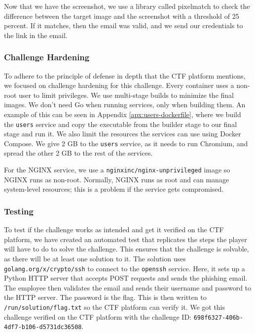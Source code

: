 Now that we have the screenshot, we use a library called pixelmatch\cite{github__pixelmatch} to check the difference between the target image and the screenshot with a threshold of 25 percent. If it matches, then the email was valid, and we send our credentials to the link in the email. 

\subsubsection{Challenge Hardening}

To adhere to the principle of defense in depth that the CTF platform mentions\cite{ctf_platform_documentation}, we focused on challenge hardening for this challenge. Every container uses a non-root user to limit privileges. We use multi-stage builds to minimize the final images. We don't need Go when running services, only when building them. An example of this can be seen in Appendix \ref{apx:users-dockerfile}, where we build the \texttt{users} service and copy the executable from the builder stage to our final stage and run it. We also limit the resources the services can use using Docker Compose. We give 2 GB to the \texttt{users} service, as it needs to run Chromium, and spread the other 2 GB to the rest of the services.

For the NGINX service, we use a \texttt{nginxinc/nginx-unprivileged} image so NGINX runs as non-root\cite{github__nginx_unprivileged}. Normally, NGINX runs as root and can manage system-level resources; this is a problem if the service gets compromised.

\subsubsection{Testing}

To test if the challenge works as intended and get it verified on the CTF platform, we have created an automated test that replicates the steps the player will have to do to solve the challenge. This ensures that the challenge is solvable, as there will be at least one solution to it. The solution uses \texttt{golang.org/x/crypto/ssh}\cite{golang_ssh} to connect to the \texttt{openssh} service. Here, it sets up a Python HTTP server that accepts POST requests and sends the phishing email. The employee then validates the email and sends their username and password to the HTTP server. The password is the flag. This is then written to \texttt{/run/solution/flag.txt} so the CTF platform can verify it. We got this challenge verified on the CTF platform with the challenge ID: \texttt{698f6327-406b-4df7-b106-d5731dc36508}.

